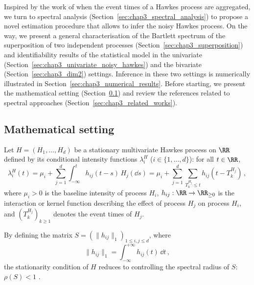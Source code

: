                Inspired by the work of \textcite{Cheysson2022} when the event times of a Hawkes process are aggregated, we turn to spectral analysis (Section~\ref{sec:chap3_spectral_analysis}) to propose a novel estimation procedure that allows to infer the noisy Hawkes process.
               On the way, we present a general characterisation of the Bartlett spectrum of the superposition of two independent processes (Section~\ref{sec:chap3_superposition})
               and identifiability results of the statistical model in the univariate (Section~\ref{sec:chap3_univariate_noisy_hawkes}) and the bivariate (Section~\ref{sec:chap3_dim2}) settings.
               Inference in these two settings is numerically illustrated in Section~\ref{sec:chap3_numerical_results}.
               Before starting, we present the mathematical setting (Section~\ref{sec:chap3_setting})
               and review the references related to spectral approaches (Section~\ref{sec:chap3_related_works}).


    
      \subsection{Mathematical setting}
      \label{sec:chap3_setting}
        Let $H = (H_1, \ldots, H_d)$ be a stationary multivariate Hawkes process on $\RR$ defined by its conditional intensity functions $\lambda_i^H$ ($i \in \{1, \dots, d\}$):
        for all $t \in \RR$,
        \begin{equation}\label{eq:chap3_hawkes_intensity}
          \lambda_i^H(t) = \mu_i + \sum_{j=1}^{d}\int_{-\infty}^{t}{h_{ij}(t-s) \, H_j(\dd s)} = \mu_i + \sum_{j=1}^{d}\sum_{T^{H_j}_k \leq t}{h_{ij}(t  - T_k^{H_j})}\,,
        \end{equation}
        where $\mu_i > 0$ is the baseline intensity of process $H_i$,
        $h_{ij} : \RR \to \RR_{\ge 0}$ is the interaction or kernel function describing the effect of process $H_j$ on process $H_i$,
        and $(T_k^{H_j})_{k\ge1}$ denotes the event times of $H_j$.
        
        By defining the matrix $S = (\|h_{ij}\|_1)_{1 \le i, j \le d}$,
        where
        \[\|h_{ij}\|_1 = \int_{-\infty}^{+\infty}{h_{ij}(t) \, \dd t}\,,\]
        the stationarity condition of $H$ reduces to controlling the spectral radius of $S$: $\rho(S)<1$ \parencite{Bremaud1996}. 
        
